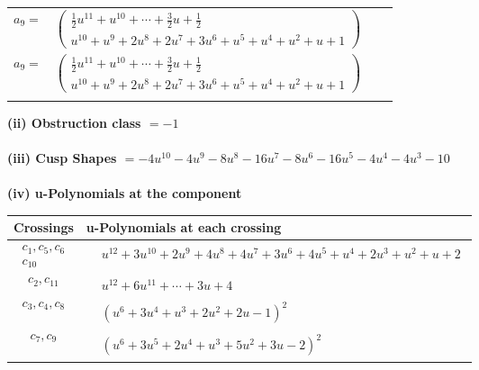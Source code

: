 \documentclass[1p]{elsarticle_modified}
\theoremstyle{definition}
\begin{document}
\begin{tabular}{m{7pt} m{180pt} m{7pt} m{180pt} }
\flushright $a_{9}=$&$\begin{pmatrix}\frac{1}{2} u^{11}+u^{10}+\cdots+\frac{3}{2} u+\frac{1}{2}\\u^{10}+u^9+2 u^8+2 u^7+3 u^6+u^5+u^4+u^2+u+1\end{pmatrix}$\\ \flushright $a_{9}=$&$\begin{pmatrix}\frac{1}{2} u^{11}+u^{10}+\cdots+\frac{3}{2} u+\frac{1}{2}\\u^{10}+u^9+2 u^8+2 u^7+3 u^6+u^5+u^4+u^2+u+1\end{pmatrix}$\\&\end{tabular}
\flushleft \textbf{(ii) Obstruction class $= -1$}\\~\\
\flushleft \textbf{(iii) Cusp Shapes $= -4 u^{10}-4 u^9-8 u^8-16 u^7-8 u^6-16 u^5-4 u^4-4 u^3-10$}\\~\\
\newpage\renewcommand{\arraystretch}{1}
\flushleft \textbf{(iv) u-Polynomials at the component}\newline \\
\begin{tabular}{m{50pt}|m{274pt}}
Crossings & \hspace{64pt}u-Polynomials at each crossing \\
\hline $$\begin{aligned}c_{1},c_{5},c_{6}\\c_{10}\end{aligned}$$&$\begin{aligned}
&u^{12}+3 u^{10}+2 u^9+4 u^8+4 u^7+3 u^6+4 u^5+u^4+2 u^3+u^2+u+2
\end{aligned}$\\
\hline $$\begin{aligned}c_{2},c_{11}\end{aligned}$$&$\begin{aligned}
&u^{12}+6 u^{11}+\cdots+3 u+4
\end{aligned}$\\
\hline $$\begin{aligned}c_{3},c_{4},c_{8}\end{aligned}$$&$\begin{aligned}
&(u^6+3 u^4+u^3+2 u^2+2 u-1)^2
\end{aligned}$\\
\hline $$\begin{aligned}c_{7},c_{9}\end{aligned}$$&$\begin{aligned}
&(u^6+3 u^5+2 u^4+u^3+5 u^2+3 u-2)^2
\end{aligned}$\\
\hline
\end{tabular}\\~\\
\end{document}
